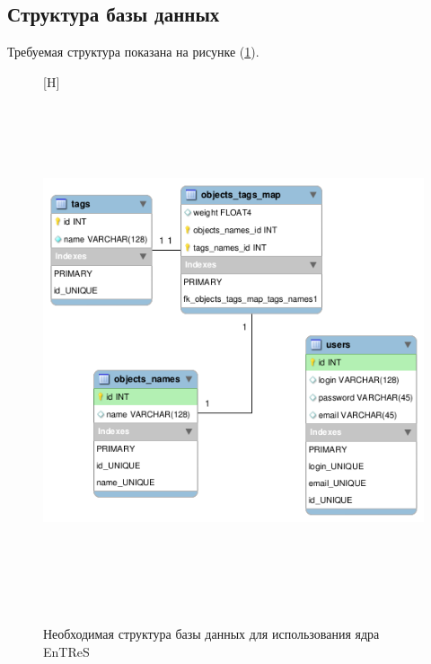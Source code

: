 \subsection{Структура базы данных}
Требуемая структура показана на рисунке (\ref{pic:bd-struct}).
\begin{figure}
	\label{pic:bd-struct}
\caption{Необходимая структура базы данных для использования ядра EnTReS}
	\begin{center}[H]
  \includegraphics[width=6in,height=6in]{pics/db-scheme-core.png}
\end{center}
\end{figure}

